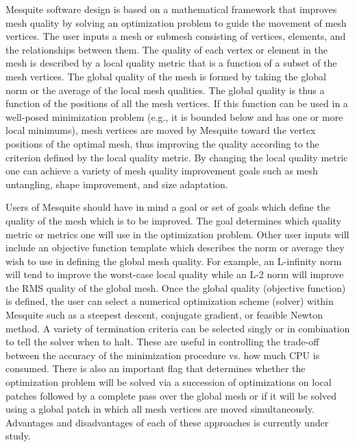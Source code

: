 Mesquite software design is based on a mathematical 
framework that improves mesh quality by solving an optimization 
problem to guide the movement of mesh vertices. The user inputs a mesh or 
submesh consisting of vertices, elements, and the relationships between them. 
The quality of each vertex or 
element in the mesh is described by a local quality metric that is a function 
of a subset of the mesh vertices. The global quality of the mesh is formed by 
taking the global norm or the average of the local mesh qualities. The global 
quality is thus a function of the positions of all the mesh vertices. If this 
function can be used in a well-posed minimization problem (e.g., it is 
bounded below and has one or more local minimums), mesh vertices are moved 
by Mesquite toward the vertex positions of the optimal mesh, thus improving 
the quality according to the criterion defined by the local quality metric. 
By changing the local quality metric one can achieve a variety of mesh quality improvement goals such as mesh untangling, shape improvement, and size adaptation. \newline

Users of Mesquite should have in mind a goal or set of goals which define 
the quality of the mesh which is to be improved. The goal determines which
quality metric or metrics one will use in the optimization problem. Other 
user inputs will include an objective function template which describes 
the norm or average they wish to use in defining the global mesh quality. 
For example, an L-infinity norm will tend to improve the worst-case local 
quality while an L-2 norm will improve the RMS quality of the global mesh. 
Once the global quality (objective function) is defined, the user can 
select a numerical optimization scheme (solver) within Mesquite such as a 
steepest descent, conjugate gradient, or feasible Newton method. A variety of 
termination criteria can be selected singly or in combination to tell the 
solver when to halt. These are useful in controlling the trade-off between
the accuracy of the minimization procedure vs. how much CPU is consumed. 
There is also an important flag that determines whether the optimization 
problem will be solved via a succession of optimizations on local patches 
followed by a complete pass over the global mesh or if it will be solved using 
a global patch in which all mesh vertices are moved simultaneously. Advantages
and disadvantages of each of these approaches is currently under study.\newline

